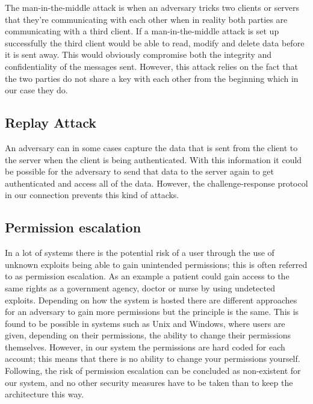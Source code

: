 \documentclass{article}
\begin{document}
The man-in-the-middle attack is when an adversary tricks two clients or servers that they’re communicating with each other when in reality both parties are communicating with a third client\cite[p.728]{stalbrown}. If a man-in-the-middle attack is set up successfully the third client would be able to read, modify and delete data before it is sent away. This would obviously compromise both the integrity and confidentiality of the messages sent. However, this attack relies on the fact that the two parties do not share a key with each other from the beginning which in our case they do.

\subsection*{Replay Attack}

An adversary can in some cases capture the data that is sent from the client to the server when the client is being authenticated\cite[p.119]{stalbrown}. With this information it could be possible for the adversary to send that data to the server again to get authenticated and access all of the data. However, the challenge-response protocol in our connection prevents this kind of attacks.

\subsection*{Permission escalation}

In a lot of systems there is the potential risk of a user through the use of unknown exploits being able to gain unintended permissions; this is often referred to as permission escalation. As an example a patient could gain access to the same rights as a government agency, doctor or nurse by using undetected exploits. Depending on how the system is hosted there are different approaches for an adversary to gain more permissions but the principle is the same. This is found to be possible in systems such as Unix and Windows, where users are given, depending on their permissions, the ability to change their permissions themselves. However, in our system the permissions are hard coded for each account; this means that there is no ability to change your permissions yourself. Following, the risk of permission escalation can be concluded as non-existent for our system, and no other security measures have to be taken than to keep the architecture this way. 
\newpage
\end{document}
